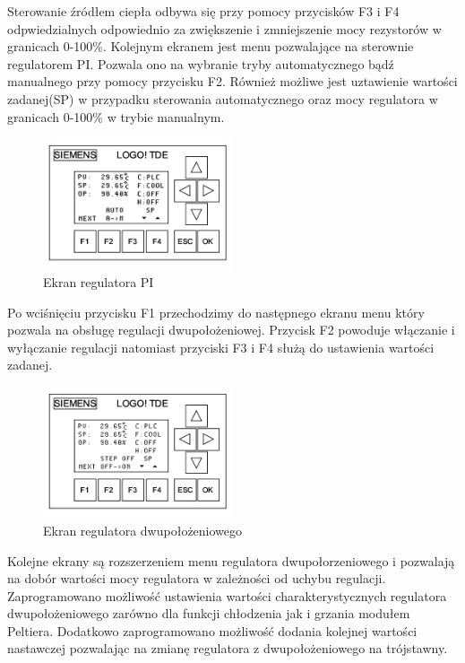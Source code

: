 \documentclass[oneside]{mgr}
\begin{document}
Sterowanie źródłem ciepła odbywa się przy pomocy przycisków F3 i F4 odpwiedzialnych odpowiednio za zwiększenie i zmniejszenie mocy rezystorów w granicach 0-100\%.
\newpage
Kolejnym ekranem jest menu pozwalające na sterownie regulatorem PI. Pozwala ono na wybranie tryby automatycznego bądź manualnego przy pomocy przycisku F2. Również możliwe jest uztawienie wartości zadanej(SP) w przypadku sterowania automatycznego oraz mocy regulatora w granicach 0-100\% w trybie manualnym.
\begin{center}
\begin{figure}[h!]
    \centering
    \includegraphics[width=0.5\textwidth]{Ekran4.jpg}
    \caption{Ekran regulatora PI}
    \end{figure}
\end{center}
Po wciśnięciu przycisku F1 przechodzimy do następnego ekranu menu który pozwala na obsługę regulacji dwupołożeniowej. Przycisk F2 powoduje włączanie i wyłączanie regulacji natomiast przyciski F3 i F4 służą do ustawienia wartości zadanej.
\begin{center}
\begin{figure}[h!]
    \centering
    \includegraphics[width=0.5\textwidth]{Ekran5.jpg}
    \caption{Ekran regulatora dwupołożeniowego}
    \end{figure}
\end{center}
Kolejne ekrany są rozszerzeniem menu regulatora dwupołorzeniowego i pozwalają na dobór wartości mocy regulatora w zależności od uchybu regulacji. Zaprogramowano możliwość ustawienia wartości charakterystycznych regulatora dwupołożeniowego zarówno dla funkcji chłodzenia jak i grzania modułem Peltiera. Dodatkowo zaprogramowano możliwość dodania kolejnej wartości nastawczej pozwalając na zmianę regulatora z dwupołożeniowego na trójstawny.
\end{document}
